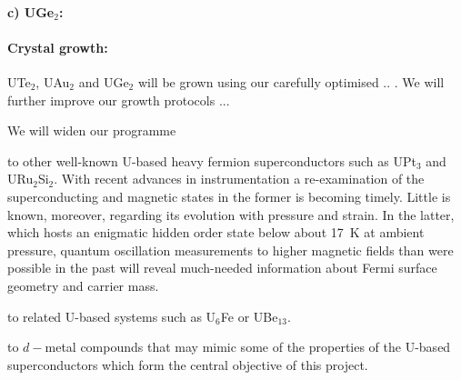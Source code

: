   \paragraph{c) UGe$_2$:}
  
  
  
\paragraph{Crystal growth:} UTe$_2$, UAu$_2$ and UGe$_2$ will be grown using our carefully optimised .. .   We will further improve our growth protocols ... 

\vspace{0.5em}
\noindent 
We will widen our  programme
\begin{leftlist}
\item to other well-known U-based heavy fermion superconductors such as UPt$_3$ and URu$_2$Si$_2$. With recent advances in instrumentation a re-examination of the superconducting and magnetic states in the former is becoming timely. Little is known, moreover, regarding its evolution with pressure and strain. In the latter, which hosts an enigmatic hidden order state below about \SI{17}{\kelvin} at ambient pressure, quantum oscillation measurements to higher magnetic fields than were possible in the past will reveal much-needed information about Fermi surface geometry and carrier mass. 
\item to related U-based systems such as U$_6$Fe or UBe$_{13}$. %
\item to 
 $d-$metal compounds that may mimic some of the properties of the U-based superconductors which form the central objective of this project.
\end{leftlist}
